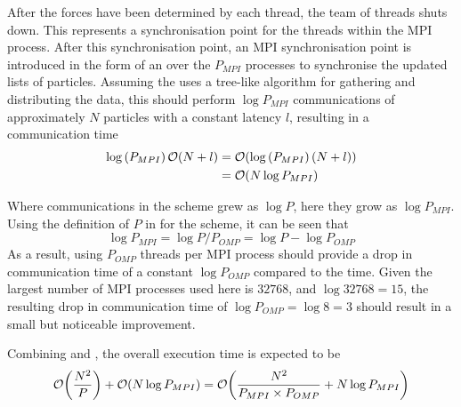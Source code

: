 %
After the forces have been determined by each thread, the team of threads
shuts down.
%
This represents a synchronisation point for the threads within the
MPI process.
%
After this \openmp{} synchronisation point,
an MPI synchronisation point is introduced in the form of
an \mpiallgatherv{} over the $P_{MPI}$ processes
to synchronise the updated lists of particles.
%
Assuming the \mpiallgatherv{} uses a tree-like algorithm for
gathering and distributing the data, this should perform
$\log{P_{MPI}}$ communications of approximately $N$ particles
with a constant latency $l$, resulting in a communication time
\begin{equation}
    \label{eqn:shared_and_replicated_communication_time}
    \begin{split}
        \log{(P_{MPI})}\,\mathcal{O}{\left({ N + l }\right)} 
            &= \mathcal{O}{\left({ \log{(P_{MPI})}\,(N+l) }\right)} \\
            &= \mathcal{O}{\left({ N\log{P_{MPI}} }\right)}
    \end{split}
\end{equation}

Where communications in the \replicateddata{} scheme grew as $\log{P}$,
here they grow as $\log{P_{MPI}}$.
%
Using the definition of $P$ in  for the
\sharedandreplicateddata{} scheme, it can be seen that
\begin{equation}
    \log{P_{MPI}} = \log{P/P_{OMP}} = \log{P} - \log{P_{OMP}}
\end{equation}
%
As a result, using $P_{OMP}$ threads per MPI process should provide
a drop in communication time of a constant $\log{P_{OMP}}$ compared
to the \replicateddata{} time.
%
Given the largest number of MPI processes used here is $32768$,
and $\log{32768} = 15$, the resulting drop in communication
time of $\log{P_{OMP}} = \log{8} = 3$ should result in a small
but noticeable improvement.


%
Combining
 and
,
the overall execution time is expected to be
\begin{equation}
    \label{eqn:shared_and_replicated_data_overall_time}
    \mathcal{O}{\left({ \frac{N^2}{P} }\right)} + \mathcal{O}{\left({ N\log{P_{MPI}} }\right)}
        = \mathcal{O}{\left({ \frac{N^2}{P_{MPI} \times{} P_{OMP}} + N\log{P_{MPI}} }\right)}
\end{equation}


